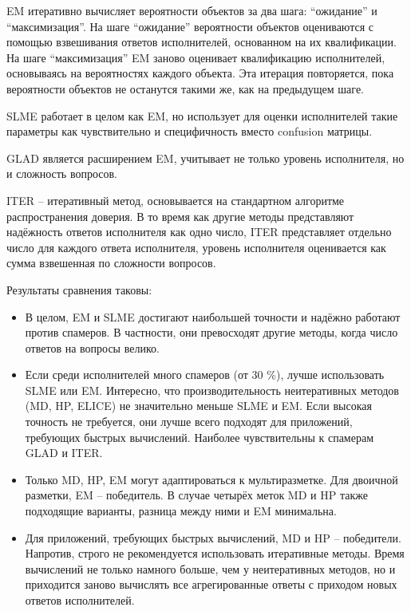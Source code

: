 \documentclass[specification,annotation,times]{itmo-student-thesis}
\begin{document}
EM итеративно вычисляет вероятности объектов за два шага: “ожидание” и “максимизация”. На шаге “ожидание” вероятности объектов оцениваются с помощью взвешивания ответов исполнителей, основанном на их квалификации. На шаге “максимизация” EM заново оценивает квалификацию исполнителей, основываясь на вероятностях каждого объекта. Эта итерация повторяется, пока вероятности объектов не останутся такими же, как на предыдущем шаге.

SLME работает в целом как EM, но использует для оценки исполнителей такие параметры как чувствительно и специфичность вместо confusion матрицы.

GLAD является расширением EM, учитывает не только уровень исполнителя, но и сложность вопросов.

ITER – итеративный метод, основывается на стандартном алгоритме распространения доверия. В то время как другие методы представляют надёжность ответов исполнителя как одно число, ITER представляет отдельно число для каждого ответа исполнителя, уровень исполнителя оценивается как сумма взвешенная по сложности вопросов.

Результаты сравнения таковы:
\begin{itemize}
    \item В целом, EM и SLME достигают наибольшей точности и надёжно работают против спамеров. В частности, они превосходят другие методы, когда число ответов на вопросы велико.
    \item Если среди исполнителей много спамеров (от 30 \%), лучше использовать SLME или EM. Интересно, что производительность неитеративных методов (MD, HP, ELICE) не значительно меньше SLME и EM. Если высокая точность не требуется, они лучше всего подходят для приложений, требующих быстрых вычислений. Наиболее чувствительны к спамерам GLAD и ITER.
    \item Только MD, HP, EM могут адаптироваться к мультиразметке. Для двоичной разметки, EM – победитель. В случае четырёх меток MD и HP также подходящие варианты, разница между ними и EM минимальна.
    \item Для приложений, требующих быстрых вычислений, MD и HP – победители. Напротив, строго не рекомендуется использовать итеративные методы. Время вычислений не только намного больше, чем у неитеративных методов, но и приходится заново вычислять все агрегированные ответы с приходом новых ответов исполнителей.
\end{itemize}


\end{document}
